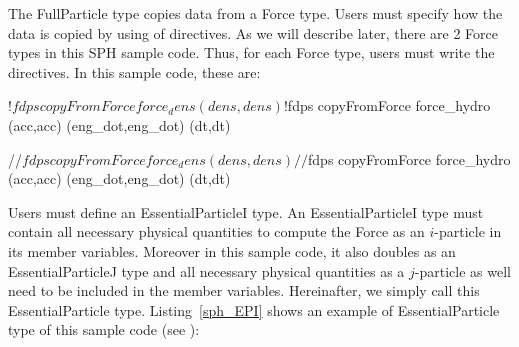 The \textsf{FullParticle} type copies data from a \textsf{Force} type. Users must specify how the data is copied by using of directives. As we will describe later, there are 2 \textsf{Force} types in this SPH sample code. Thus, for each \textsf{Force} type, users must write the directives. In this sample code, these are:
\endifIF
\ifFtn %
\begin{screen}
\begin{spverbatim}
!$fdps copyFromForce force_dens (dens,dens)
!$fdps copyFromForce force_hydro (acc,acc) (eng_dot,eng_dot) (dt,dt)
\end{spverbatim}
\end{screen}
\endifFtn
\ifC %
\begin{screen}
\begin{spverbatim}
//$fdps copyFromForce force_dens (dens,dens)
//$fdps copyFromForce force_hydro (acc,acc) (eng_dot,eng_dot) (dt,dt)
\end{spverbatim}
\end{screen}
\endifC

Users must define an \textsf{EssentialParticleI} type. An \textsf{EssentialParticleI} type must contain all necessary physical quantities to compute the \textsf{Force} as an $i$-particle in its member variables. Moreover in this sample code, it also doubles as an \textsf{EssentialParticleJ} type and all necessary physical quantities as a $j$-particle as well need to be included in the member variables. Hereinafter, we simply call this \textsf{EssentialParticle} type. Listing~\ref{sph_EPI} shows an example of \textsf{EssentialParticle} type of this sample code (see ):

\ifCpp %

\endifCpp
\ifFtn %

\endifFtn
\ifC %

\endifC

